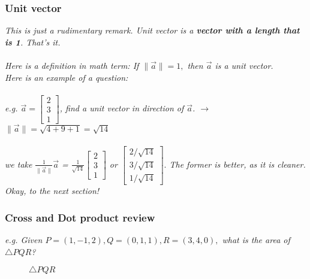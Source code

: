 \documentclass[addpoints]{exam}
\begin{document}
\subsubsection{
Unit vector
}
\textit{
This is just a rudimentary remark. Unit vector is a \textbf{vector with a length that is 1}. That's it.\\\\
Here is a definition in math term:
If $\|\vec{a}\|=1,$ then $\vec{a}$ is a unit vector. \\Here is an example of a question:\\\\
e.g. \(
\vec{a}=\begin{bmatrix}
    2\\3\\1
\end{bmatrix} 
\), find a unit vector in direction of $\vec{a}$. $\rightarrow$ $\|\vec{a}\| = \sqrt{4+9+1} = \sqrt{14}$ \\\\we take $\frac{1}{\|\vec{a}\|}\vec{a}$ = $\frac{1}{\sqrt{14}}\begin{bmatrix}
    2\\3\\1
\end{bmatrix}$ or $\begin{bmatrix}
    2/\sqrt{14}\\3/\sqrt{14}\\1/\sqrt{14}
\end{bmatrix}.$ The former is better, as it is cleaner. Okay, to the next section! 
}
\pagebreak\subsubsection*{
Cross and Dot product review
}
\textit{
e.g.  Given $P=(1,-1,2), Q=(0,1,1), R=(3,4,0),$ what is the area of $\triangle PQR$?
}
\begin{figure}[!h]
    \centering
    \caption{$\triangle PQR$}
    \label{fig:Triangle PQR}
\end{figure}\\\\
\end{document}
